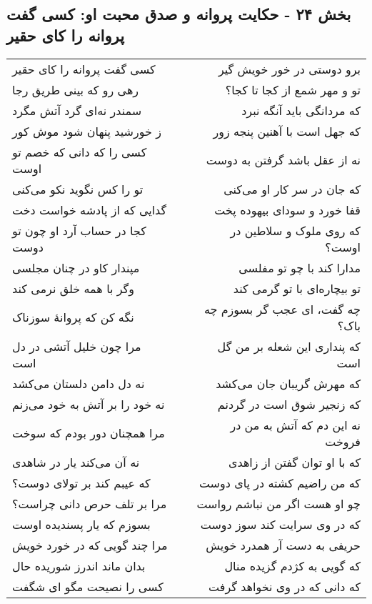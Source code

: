 \begin{center}
\section*{بخش ۲۴ - حکایت پروانه و صدق محبت او: کسی گفت پروانه را کای حقیر}
\label{sec:024}
\begin{longtable}{l p{0.5cm} r}
کسی گفت پروانه را کای حقیر
&&
برو دوستی در خور خویش گیر
\\
رهی رو که بینی طریق رجا
&&
تو و مهر شمع از کجا تا کجا؟
\\
سمندر نه‌ای گرد آتش مگرد
&&
که مردانگی باید آنگه نبرد
\\
ز خورشید پنهان شود موش کور
&&
که جهل است با آهنین پنجه زور
\\
کسی را که دانی که خصم تو اوست
&&
نه از عقل باشد گرفتن به دوست
\\
تو را کس نگوید نکو می‌کنی
&&
که جان در سر کار او می‌کنی
\\
گدایی که از پادشه خواست دخت
&&
قفا خورد و سودای بیهوده پخت
\\
کجا در حساب آرد او چون تو دوست
&&
که روی ملوک و سلاطین در اوست؟
\\
مپندار کاو در چنان مجلسی
&&
مدارا کند با چو تو مفلسی
\\
وگر با همه خلق نرمی کند
&&
تو بیچاره‌ای با تو گرمی کند
\\
نگه کن که پروانهٔ سوزناک
&&
چه گفت، ای عجب گر بسوزم چه باک؟
\\
مرا چون خلیل آتشی در دل است
&&
که پنداری این شعله بر من گل است
\\
نه دل دامن دلستان می‌کشد
&&
که مهرش گریبان جان می‌کشد
\\
نه خود را بر آتش به خود می‌زنم
&&
که زنجیر شوق است در گردنم
\\
مرا همچنان دور بودم که سوخت
&&
نه این دم که آتش به من در فروخت
\\
نه آن می‌کند یار در شاهدی
&&
که با او توان گفتن از زاهدی
\\
که عیبم کند بر تولای دوست؟
&&
که من راضیم کشته در پای دوست
\\
مرا بر تلف حرص دانی چراست؟
&&
چو او هست اگر من نباشم رواست
\\
بسوزم که یار پسندیده اوست
&&
که در وی سرایت کند سوز دوست
\\
مرا چند گویی که در خورد خویش
&&
حریفی به دست آر همدرد خویش
\\
بدان ماند اندرز شوریده حال
&&
که گویی به کژدم گزیده منال
\\
کسی را نصیحت مگو ای شگفت
&&
که دانی که در وی نخواهد گرفت

\end{longtable}
\end{center}
